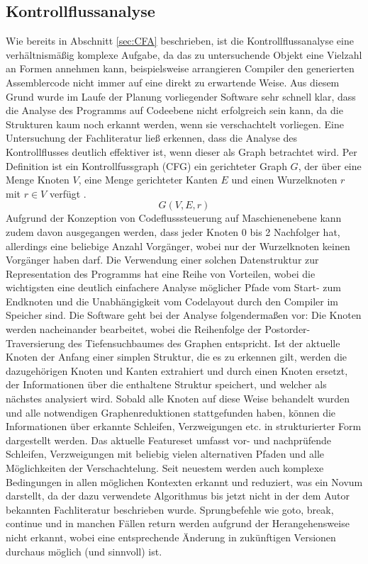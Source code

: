 \documentclass[11pt]{article}
\begin{document}
\subsection{Kontrollflussanalyse} Wie bereits in Abschnitt \ref{sec:CFA} beschrieben, ist die
Kontrollflussanalyse eine verhältnismäßig komplexe Aufgabe, da das zu untersuchende Objekt eine
Vielzahl an Formen annehmen kann, beispielsweise arrangieren Compiler den generierten Assemblercode
nicht immer auf eine direkt zu erwartende Weise. Aus diesem Grund wurde im Laufe der Planung
vorliegender Software sehr schnell klar, dass die Analyse des Programms auf Codeebene nicht
erfolgreich sein kann, da die Strukturen kaum noch erkannt werden, wenn sie verschachtelt vorliegen.
Eine Untersuchung der Fachliteratur ließ erkennen, dass die Analyse des Kontrollflusses deutlich
effektiver ist, wenn dieser als Graph betrachtet wird. Per Definition ist ein Kontrollfussgraph
(CFG) ein gerichteter Graph \(G\), der über eine Menge Knoten \(V\), eine Menge gerichteter Kanten
\(E\) und einen Wurzelknoten \(r\) mit \(r \in V\) verfügt \cite{wiki1:3}. \[G(V,E,r)\] Aufgrund der
Konzeption von Codeflusssteuerung auf Maschienenebene kann zudem davon ausgegangen werden, dass jeder
Knoten 0 bis 2 Nachfolger hat, allerdings eine beliebige Anzahl Vorgänger, wobei nur der
Wurzelknoten keinen Vorgänger haben darf. Die Verwendung einer solchen Datenstruktur zur
Representation des Programms hat eine Reihe von Vorteilen, wobei die wichtigsten eine deutlich
einfachere Analyse möglicher Pfade vom Start- zum Endknoten und die Unabhängigkeit vom Codelayout
durch den Compiler im Speicher sind. Die Software geht bei der Analyse folgendermaßen vor: Die
Knoten werden nacheinander bearbeitet, wobei die Reihenfolge der Postorder-Traversierung des
Tiefensuchbaumes des Graphen entspricht. Ist der aktuelle Knoten der Anfang einer simplen Struktur,
die es zu erkennen gilt, werden die dazugehörigen Knoten und Kanten extrahiert und durch einen
Knoten ersetzt, der Informationen über die enthaltene Struktur speichert, und welcher als nächstes
analysiert wird. Sobald alle Knoten auf diese Weise behandelt wurden und alle notwendigen
Graphenreduktionen stattgefunden haben, können die Informationen über erkannte Schleifen,
Verzweigungen etc. in strukturierter Form dargestellt werden. Das aktuelle Featureset umfasst vor-
und nachprüfende Schleifen, Verzweigungen mit beliebig vielen alternativen Pfaden und alle 
Möglichkeiten der Verschachtelung. Seit neuestem werden auch komplexe Bedingungen in allen
möglichen Kontexten erkannt und reduziert, was ein Novum darstellt, da der dazu verwendete
Algorithmus bis jetzt nicht in der dem Autor bekannten Fachliteratur beschrieben wurde. Sprungbefehle
wie goto, break, continue und in manchen Fällen return werden aufgrund der Herangehensweise nicht
erkannt, wobei eine entsprechende Änderung in zukünftigen Versionen durchaus möglich (und sinnvoll) ist.
\end{document}
